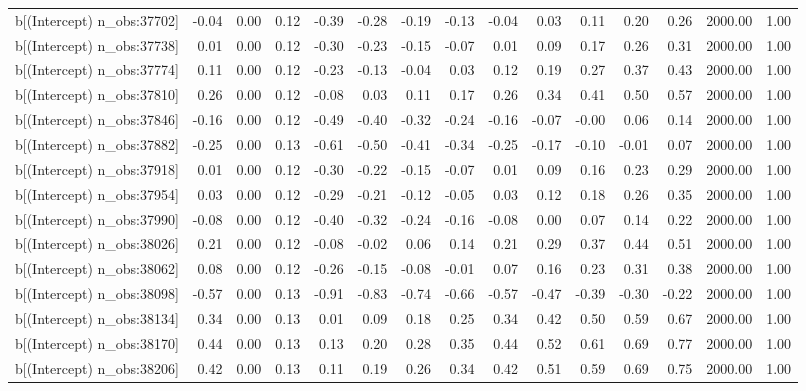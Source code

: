 \begin{table}[ht]
\begin{tabular}{rrrrrrrrrrrrrrr}
  b[(Intercept) n\_obs:37702] & -0.04 & 0.00 & 0.12 & -0.39 & -0.28 & -0.19 & -0.13 & -0.04 & 0.03 & 0.11 & 0.20 & 0.26 & 2000.00 & 1.00 \\ 
  b[(Intercept) n\_obs:37738] & 0.01 & 0.00 & 0.12 & -0.30 & -0.23 & -0.15 & -0.07 & 0.01 & 0.09 & 0.17 & 0.26 & 0.31 & 2000.00 & 1.00 \\ 
  b[(Intercept) n\_obs:37774] & 0.11 & 0.00 & 0.12 & -0.23 & -0.13 & -0.04 & 0.03 & 0.12 & 0.19 & 0.27 & 0.37 & 0.43 & 2000.00 & 1.00 \\ 
  b[(Intercept) n\_obs:37810] & 0.26 & 0.00 & 0.12 & -0.08 & 0.03 & 0.11 & 0.17 & 0.26 & 0.34 & 0.41 & 0.50 & 0.57 & 2000.00 & 1.00 \\ 
  b[(Intercept) n\_obs:37846] & -0.16 & 0.00 & 0.12 & -0.49 & -0.40 & -0.32 & -0.24 & -0.16 & -0.07 & -0.00 & 0.06 & 0.14 & 2000.00 & 1.00 \\ 
  b[(Intercept) n\_obs:37882] & -0.25 & 0.00 & 0.13 & -0.61 & -0.50 & -0.41 & -0.34 & -0.25 & -0.17 & -0.10 & -0.01 & 0.07 & 2000.00 & 1.00 \\ 
  b[(Intercept) n\_obs:37918] & 0.01 & 0.00 & 0.12 & -0.30 & -0.22 & -0.15 & -0.07 & 0.01 & 0.09 & 0.16 & 0.23 & 0.29 & 2000.00 & 1.00 \\ 
  b[(Intercept) n\_obs:37954] & 0.03 & 0.00 & 0.12 & -0.29 & -0.21 & -0.12 & -0.05 & 0.03 & 0.12 & 0.18 & 0.26 & 0.35 & 2000.00 & 1.00 \\ 
  b[(Intercept) n\_obs:37990] & -0.08 & 0.00 & 0.12 & -0.40 & -0.32 & -0.24 & -0.16 & -0.08 & 0.00 & 0.07 & 0.14 & 0.22 & 2000.00 & 1.00 \\ 
  b[(Intercept) n\_obs:38026] & 0.21 & 0.00 & 0.12 & -0.08 & -0.02 & 0.06 & 0.14 & 0.21 & 0.29 & 0.37 & 0.44 & 0.51 & 2000.00 & 1.00 \\ 
  b[(Intercept) n\_obs:38062] & 0.08 & 0.00 & 0.12 & -0.26 & -0.15 & -0.08 & -0.01 & 0.07 & 0.16 & 0.23 & 0.31 & 0.38 & 2000.00 & 1.00 \\ 
  b[(Intercept) n\_obs:38098] & -0.57 & 0.00 & 0.13 & -0.91 & -0.83 & -0.74 & -0.66 & -0.57 & -0.47 & -0.39 & -0.30 & -0.22 & 2000.00 & 1.00 \\ 
  b[(Intercept) n\_obs:38134] & 0.34 & 0.00 & 0.13 & 0.01 & 0.09 & 0.18 & 0.25 & 0.34 & 0.42 & 0.50 & 0.59 & 0.67 & 2000.00 & 1.00 \\ 
  b[(Intercept) n\_obs:38170] & 0.44 & 0.00 & 0.13 & 0.13 & 0.20 & 0.28 & 0.35 & 0.44 & 0.52 & 0.61 & 0.69 & 0.77 & 2000.00 & 1.00 \\ 
  b[(Intercept) n\_obs:38206] & 0.42 & 0.00 & 0.13 & 0.11 & 0.19 & 0.26 & 0.34 & 0.42 & 0.51 & 0.59 & 0.69 & 0.75 & 2000.00 & 1.00 \\ 

\end{tabular}
\end{table}
